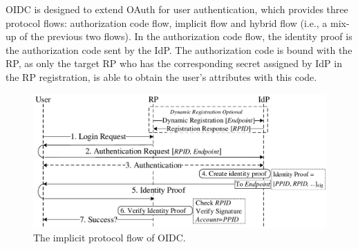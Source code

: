 

OIDC is designed to extend OAuth for user authentication,
 which provides three protocol flows: authorization code flow, implicit flow and hybrid flow (i.e., a mix-up of the previous two flows).
In the authorization code flow, the identity proof is the authorization code sent by the IdP.
 The authorization code is bound with the RP, as only the target RP who has the corresponding secret assigned by IdP in the RP registration, is able to obtain the user's attributes with this  code. %
\begin{figure}[t]
  \centering
  \includegraphics[width=\linewidth]{fig/OIDC1.pdf}
  \caption{The implicit protocol flow of OIDC.}
  \label{fig:OpenID}
\end{figure}

